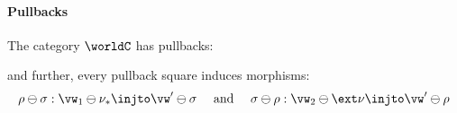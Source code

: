 
\paragraph{Pullbacks}

The category $\worldC$ has pullbacks:
\begin{center}
\end{center}
and further, every pullback square induces morphisms:
\[\begin{array}{lcr}
    \rho \ominus \sigma : \vw_1 \ominus \nu_* \injto \vw' \ominus \sigma & \text{ and } & 
    \sigma \ominus \rho : \vw_2 \ominus \ext\nu \injto \vw' \ominus \rho
\end{array}\]
